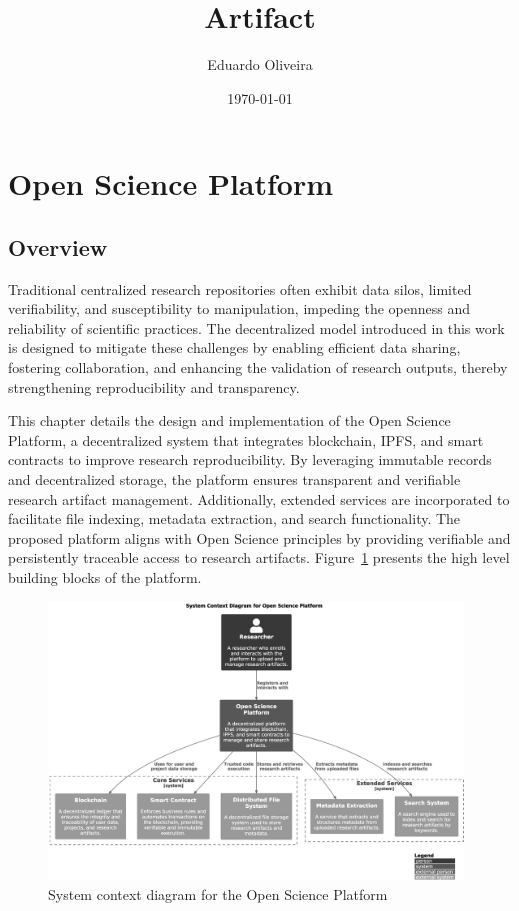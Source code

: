 \documentclass{article}
\title{Artifact}
\author{Eduardo Oliveira}
\date{\today}
\begin{document}
\maketitle

\section{Open Science Platform}

\subsection{Overview}

Traditional centralized research repositories often exhibit data silos, limited verifiability, and susceptibility to manipulation, impeding the openness and reliability of scientific practices. The decentralized model introduced in this work is designed to mitigate these challenges by enabling efficient data sharing, fostering collaboration, and enhancing the validation of research outputs, thereby strengthening reproducibility and transparency.

This chapter details the design and implementation of the Open Science Platform, a decentralized system that integrates blockchain, IPFS, and smart contracts to improve research reproducibility. By leveraging immutable records and decentralized storage, the platform ensures transparent and verifiable research artifact management. Additionally, extended services are incorporated to facilitate file indexing, metadata extraction, and search functionality. The proposed platform aligns with Open Science principles by providing verifiable and persistently traceable access to research artifacts. Figure~\ref{fig:c4_context_diagram} presents the high level building blocks of the platform.



\begin{figure}[htbp]
      \centering
      \includegraphics[width=0.98\textwidth, keepaspectratio]{c4_context_diagram.eps}
      \caption{System context diagram for the Open Science Platform}
      \label{fig:c4_context_diagram}
\end{figure}
\end{document}

